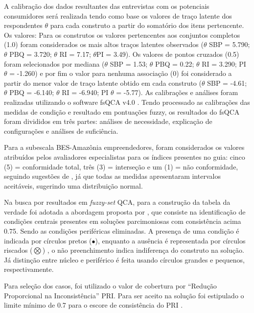 A calibração dos dados resultantes das entrevistas com os potenciais consumidores será realizada tendo como base os valores de traço latente dos respondentes $\theta$ para cada construto a partir do somatório dos itens pertencente. Os valores: Para os construtos os valores pertencentes aos conjuntos completos (1.0) foram considerados os mais altos traços latentes observados ($\theta$ SBP = 5.790; $\theta$ PBQ = 3.720; $\theta$ RI = 7.17; $\theta$PI = 3.49).  Os valores de pontos cruzados (0.5) foram selecionados por mediana ($\theta$ SBP = 1.53; $\theta$ PBQ = 0.22; $\theta$ RI = 3.290; PI $\theta$ = -1.260) e por fim o valor para nenhuma associação (0) foi considerado a partir do menor valor de traço latente obtido em cada construto ($\theta$ SBP = -4.61; $\theta$ PBQ = -6.140; $\theta$ RI = -6.940; PI $\theta$ = -5.77). As calibrações e análises foram realizadas utilizando o software fsQCA v4.0 \cite{Ragin2023AnalyticResearch}. Tendo processado as calibrações das medidas de condição e resultado em pontuações fuzzy, os resultados do fsQCA foram divididos em três partes: análises de necessidade, explicação de configurações e análises de suficiência.

Para a subescala BES-Amazônia empreendedores, foram considerados os valores atribuídos pelos avaliadores especialistas para os índices presentes no guia: cinco (5) = conformidade total, três (3) = interseção e um (1) = não conformidade, seguindo sugestões de , já que todas as medidas apresentaram intervalos aceitáveis, sugerindo uma distribuição normal. 

Na busca por resultados em \textit{fuzzy-set} QCA, para a construção da tabela da verdade foi adotada a abordagem proposta por , que consiste na identificação de condições centrais presentes em soluções parcimoniosas com consistência acima 0.75. Sendo as condições periféricas eliminadas. A presença de uma condição é indicada por círculos pretos ($\bullet$), enquanto a ausência é representada por círculos riscados ($\bigotimes$) \cite{Ragin2008NetDemonstration}, o não preenchimento indica indiferença do construto na solução. Já distinção entre núcleo e periférico é feita usando círculos grandes e pequenos, respectivamente.

Para seleção dos casos, foi utilizado o valor de cobertura por “Redução Proporcional na Inconsistência” PRI. Para ser aceito na solução foi estipulado o limite mínimo de 0.7 para o escore de consistência do PRI \cite{Greckhamer2018StudyingResearch}. 

